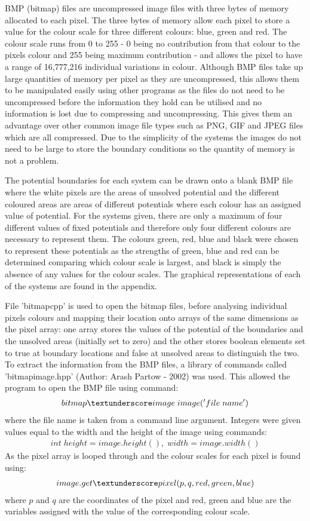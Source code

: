 BMP (bitmap) files are uncompressed image files with three bytes of memory allocated to
each pixel. The three bytes of memory allow each pixel to store a value for the colour
scale for three different colours: blue, green and red. The colour scale runs from 0 to
255 - 0 being no contribution from that colour to the pixels colour and 255 being
maximum contribution - and allows the pixel to have a range of 16,777,216 individual
variations in colour. Although BMP files take up large quantities of memory per pixel
as they are uncompressed, this allows them to be manipulated easily using other programs
as the files do not need to be uncompressed before the information they hold can be
utilised and no information is lost due to compressing and uncompressing. This gives
them an advantage over other common image file types such as PNG, GIF and JPEG files
which are all compressed. Due to the simplicity of the systems the images do not need
to be large to store the boundary conditions so the quantity of memory is not a problem. 

The potential boundaries for each system can be drawn onto a blank BMP file where the
white pixels are the areas of unsolved potential and the different coloured areas are
areas of different potentials where each colour has an assigned value of potential. For
the systems given, there are only a maximum of four different values of fixed potentials
and therefore only four different colours are necessary to represent them. The colours
green, red, blue and black were chosen to represent these potentials as the strengths of
green, blue and red can be determined comparing which colour scale is largest, and black
is simply the absence of any values for the colour scales. The graphical representations
of each of the systems are found in the appendix.

File 'bitmap\textunderscore cpp' is used to open the bitmap files, before analysing
individual pixels colours and mapping their location onto arrays of the same
dimensions as the pixel array: one array stores the values of the potential of the
boundaries and the unsolved areas (initially set to zero) and the other stores boolean
elements set to true at boundary locations and false at unsolved areas to distinguish
the two. To extract the information from the BMP files, a library of commands
called 'bitmap\textunderscore image.hpp' (Author:  Arash Partow - 2002) was used.
This allowed the program to open the BMP file using command:
%
\begin{align*}
bitmap\textunderscore image \; image('file \;name')
\end{align*}
%
where the file name is taken from a command line argument. Integers were given values
equal to the width and the height of the image using commands:
%
\begin{align*}
int\; height = image.height(),\; width = image.width()
\end{align*}
%
As the pixel array is looped through and the colour scales for each pixel is found using:
%
\begin{align*}
image.get\textunderscore pixel(p,q,red,green,blue)
\end{align*}
%
where $p$ and $q$ are the coordinates of the pixel and red, green and blue are the
variables assigned with the value of the corresponding colour scale.
